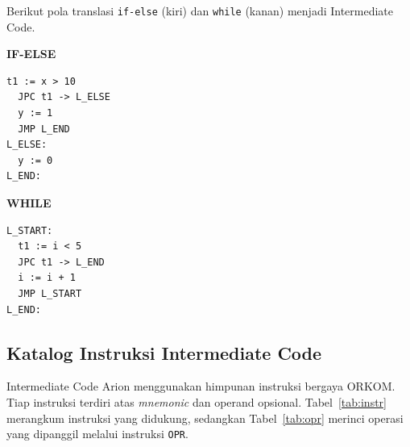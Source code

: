 Berikut pola translasi \texttt{if-else} (kiri) dan \texttt{while} (kanan) menjadi
Intermediate Code.

\begin{center}
\begin{minipage}[t]{0.46\textwidth}
\centering\textbf{IF-ELSE}
\begin{lstlisting}[style=kodeTAC, numbers=none]
  t1 := x > 10
  JPC t1 -> L_ELSE
  y := 1
  JMP L_END
L_ELSE:
  y := 0
L_END:
\end{lstlisting}
\end{minipage}\hfill
\begin{minipage}[t]{0.46\textwidth}
\centering\textbf{WHILE}
\begin{lstlisting}[style=kodeTAC, numbers=none]
L_START:
  t1 := i < 5
  JPC t1 -> L_END
  i := i + 1
  JMP L_START
L_END:
\end{lstlisting}
\end{minipage}
\end{center}

\subsection{Katalog Instruksi Intermediate Code}

Intermediate Code Arion menggunakan himpunan instruksi bergaya ORKOM. Tiap
instruksi terdiri atas \emph{mnemonic} dan operand opsional. Tabel~\ref{tab:instr}
merangkum instruksi yang didukung, sedangkan Tabel~\ref{tab:opr} merinci operasi
yang dipanggil melalui instruksi \texttt{OPR}.

